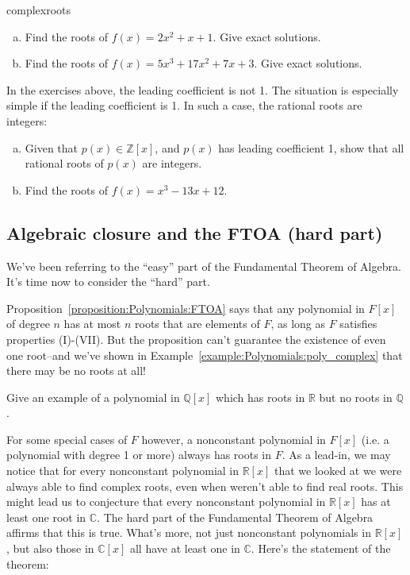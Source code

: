 \begin{exercise}{complexroots}
\begin {enumerate}[(a)]
\item
Find the roots of $f(x)=2x^2+x+1$. Give exact solutions.
\item
Find the roots of $f(x)=5x^3+17x^2+7x+3$. Give exact solutions. 
\end{enumerate}
\end{exercise}
 
In the exercises above, the leading coefficient is not 1. The situation is especially simple if the leading coefficient is 1. In such a case, the rational  roots are integers:

\begin{exercise}{}
\begin{enumerate}[(a)]
\item
Given that $p(x)  \in \mathbb{Z}[x]$, and $p(x)$ has leading coefficient 1, show that all rational roots of $p(x)$ are integers.
\item
Find the roots of $f(x)=x^3-13x+12$.
\end{enumerate}
\end{exercise}


\subsection{Algebraic closure and the FTOA (hard part)}
\label{subsec:Polynomials:PolynomialsAndDivision:FTOAhard}

We've been referring to the ``easy'' part of the Fundamental Theorem of Algebra. It's time now to consider the ``hard'' part. 

Proposition~\ref{proposition:Polynomials:FTOA} says that any polynomial in $F[x]$ of degree $n$ has at most $n$ roots that are elements of $F$, as long as $F$ satisfies properties (I)-(VII).  But the proposition can't guarantee the existence of even one root--and we've shown in Example~\ref{example:Polynomials:poly_complex} that there may be no roots at all! 

\begin{exercise}{}
Give an example of a polynomial in ${\mathbb Q}[x]$ which has roots in ${\mathbb R}$ but no roots in ${\mathbb Q}$.
\end{exercise}

For  some special cases of $F$ however, a nonconstant polynomial in $F[x]$ (i.e. a polynomial with degree 1 or more) always has roots in $F$. As a lead-in, we may notice that  for every nonconstant polynomial in $\mathbb{R}[x]$ that we looked at we were always able to find complex roots, even when weren't able to find real roots. This might lead us to conjecture that every nonconstant polynomial in $\mathbb{R}[x]$ has at least one root in $\mathbb{C}$.  The hard part of the Fundamental Theorem of Algebra affirms that this is true. What's more, not just nonconstant polynomials in $\mathbb{R}[x]$, but also those in $\mathbb{C}[x]$ all have at least one in $\mathbb{C}$. Here's the statement of the theorem:

